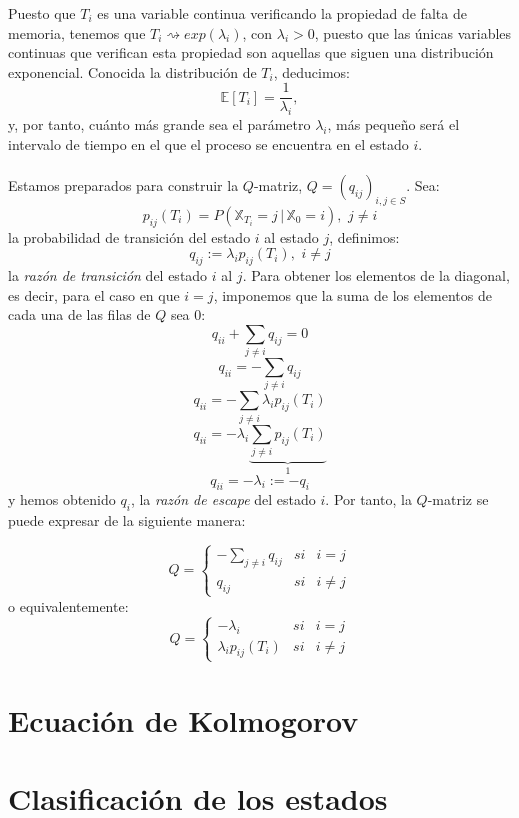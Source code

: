 \documentclass[12pt,a4paper]{article}
\begin{document}
Puesto que $T_i$ es una variable continua verificando la propiedad de falta de memoria, tenemos que $T_i\rightsquigarrow exp(\lambda_i)$, con $\lambda_i>0$, puesto que las únicas variables continuas que verifican esta propiedad son aquellas que siguen una distribución exponencial. Conocida la distribución de $T_i$, deducimos:
$$\mathbb{E}[T_i]=\dfrac{1}{\lambda_i},$$
y, por tanto, cuánto más grande sea el parámetro $\lambda_i$, más pequeño será el intervalo de tiempo en el que el proceso se encuentra en el estado $i$.
\\\\
Estamos preparados para construir la $Q$-matriz, $Q=(q_{ij})_{i,j\in S}$. Sea:
$$p_{ij}(T_i)=P(\mathbb{X}_{T_i}=j\, | \, \mathbb{X}_0=i), \,\, j\neq i$$
la probabilidad de transición del estado $i$ al estado $j$, definimos:
$$q_{ij}:=\lambda_i p_{ij}(T_i),\,\, i\neq j$$
la \textit{razón de transición} del estado $i$ al $j$. Para obtener los elementos de la diagonal, es decir, para el caso en que $i=j$, imponemos que la suma de los elementos de cada una de las filas de $Q$ sea $0$:
$$q_{ii}+\sum_{j\neq i}q_{ij}=0$$
$$q_{ii}=-\sum_{j\neq i}q_{ij}$$
$$q_{ii}=-\sum_{j\neq i}\lambda_i p_{ij}(T_i)$$
$$q_{ii}=-\lambda_i\underbrace{\sum_{j\neq i}p_{ij}(T_i)}_{1}$$
$$q_{ii}=-\lambda_i:=-q_i$$
y hemos obtenido $q_i$, la \textit{razón de escape} del estado $i$. Por tanto, la $Q$-matriz se puede expresar de la siguiente manera:

$$Q= \left\{ \begin{array}{lcc}
   	   	             -\sum\limits_{j\neq i}q_{ij} &   si  & i=j \\
   	   	             q_{ij} &  si & i\neq j
   	   	             \end{array} \right. $$
o equivalentemente:
$$Q= \left\{ \begin{array}{lcc}
   	   	             -\lambda_i &   si  & i=j \\
   	   	             \lambda_i p_{ij}(T_i) &  si & i\neq j
   	   	             \end{array} \right. $$

\section{Ecuación de Kolmogorov}
\section{Clasificación de los estados}
\end{document}
